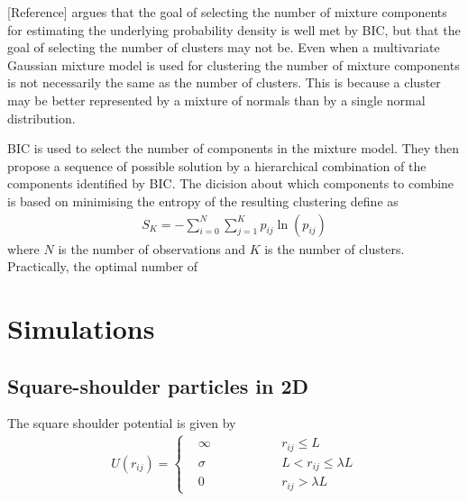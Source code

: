 \documentclass{report}
\begin{document}
[Reference] argues that the goal of selecting the number of mixture components for estimating the underlying probability density is well met by BIC, but that the goal of selecting the number of clusters may not be. Even when a multivariate Gaussian mixture model is used for clustering the number of mixture components is not necessarily the same as the number of clusters. This is because a cluster may be better represented by a mixture of normals than by a single normal distribution.

BIC is used to select the number of components in the mixture model. They then propose a sequence of possible solution by a hierarchical combination of the components identified by BIC. 
The dicision about which components to combine is based on minimising the entropy of the resulting clustering define as
\begin{align}
	S_K=-\sum_{i=0}^N\sum_{j=1}^K p_{ij}\ln(p_{ij})
\end{align}
where $N$ is the number of observations and $K$ is the number of clusters. Practically, the optimal number of 


\chapter{Simulations}

\section{Square-shoulder particles in 2D}


The square shoulder potential is given by
\begin{align}
	U(r_{ij})=\left\{
	\begin{aligned}
		&\infty \qquad\qquad && r_{ij}\leq L\\
		&\sigma &&L<r_{ij}\leq\lambda L\\
		&0 && r_{ij}>\lambda L
	\end{aligned}
	\right.
\end{align}
\end{document}
